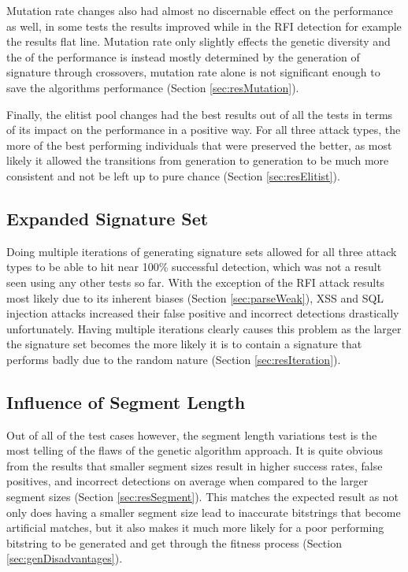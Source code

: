 Mutation rate changes also had almost no discernable effect on the performance as well, in some tests the results improved while in the RFI detection for example the results flat line.  Mutation rate only slightly effects the genetic diversity and the of the performance is instead mostly determined by the generation of signature through crossovers, mutation rate alone is not significant enough to save the algorithms performance (Section \ref{sec:resMutation}).

Finally, the elitist pool changes had the best results out of all the tests in terms of its impact on the performance in a positive way.  For all three attack types, the more of the best performing individuals that were preserved the better, as most likely it allowed the transitions from generation to generation to be much more consistent and not be left up to pure chance (Section \ref{sec:resElitist}).

\subsection{Expanded Signature Set}

Doing multiple iterations of generating signature sets allowed for all three attack types to be able to hit near 100\% successful detection, which was not a result seen using any other tests so far.  With the exception of the RFI attack results most likely due to its inherent biases (Section \ref{sec:parseWeak}), XSS and SQL injection attacks increased their false positive and incorrect detections drastically unfortunately.  Having multiple iterations clearly causes this problem as the larger the signature set becomes the more likely it is to contain a signature that performs badly due to the random nature (Section \ref{sec:resIteration}).

\subsection{Influence of Segment Length}

Out of all of the test cases however, the segment length variations test is the most telling of the flaws of the genetic algorithm approach.  It is quite obvious from the results that smaller segment sizes result in higher success rates, false positives, and incorrect detections on average when compared to the larger segment sizes (Section \ref{sec:resSegment}).  This matches the expected result as not only does having a smaller segment size lead to inaccurate bitstrings that become artificial matches, but it also makes it much more likely for a poor performing bitstring to be generated and get through the fitness process (Section \ref{sec:genDisadvantages}).

